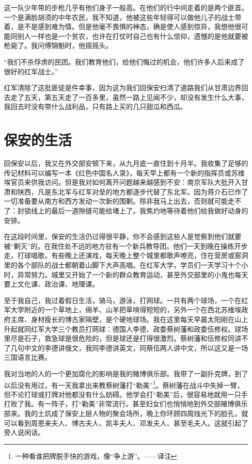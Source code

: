 \documentclass[10pt]{book}
\begin{document}
这一队少年带的步枪几乎有他们身子一般高。在他们的行中间走着的是两个匪首。一个是满脸胡须的中年农民，我不知道，他被这些年轻得可以做他儿子的战士带着，是不是感到难为情。但是他毫不畏惧的神态，确是使人感到惊异，我想他很可能同别人一样也是一个贫农，也许在打仗时自己也有什么信仰，遗憾的是他就要被枪毙了。我问傅锦魁时，他摇摇头。

“我们不杀俘虏的民团。我们教育他们，给他们悔过的机会，他们许多人后来成了很好的红军战士。”

红军清除了这批匪徒是件幸事，因为这为我们回保安扫清了道路我们从甘肃边界回去走了五天，第五天走了一百多里，虽然一路上见闻不少，却没有发生什么大事，我回去时没有带什么战利品，只有路上买的几只甜瓜和西瓜。



\section{保安的生活}

回保安以后，我又在外交部安顿下来，从九月底一直住到十月半。我收集了足够的传记材料可以编写一本《红色中国名人录》，每天早上都有一个新的指挥员或苏维埃官员来供我访问。但是我对如何离开问题越来越感到不安：南京军队大批开入甘肃和陕西，凡是东北军与红军对垒的地方都逐步代替了东北军。因为蒋介石已作了一切准备要从南方和西方发动一次新的围剿。除非我马上出去，否则就可能走不了：封锁线上的最后一道隙缝可能给堵上了。我焦灼地等待着他们给我做好动身的安排。

在这段时间里，保安的生活仍过得很平静，你不会感到这些人是觉察到他们就要被“剿灭”的。在我住处不远的地方驻有一个新兵教导团。他们一天到晚在操练开步走，打球唱歌。有些晚上还演戏，每天晚上整个城里都歌声嘹亮，住在营房或窑洞里的各个部队的战士都朝着山脚下大声高唱。在红军大学，学员们一天学习十个小时，异常努力。城里又开始了一个新的群众教育运动，甚至外交部里的小鬼也每天要上文化课、政治课、地理课。

至于我自己，我过着假日生活，骑马，游泳，打网球。一共有两个球场，一个在红军大学附近的一个草地上，绵羊、山羊把草啃得短短的，另外一个在西北苏维埃政府主席、身材瘦长的博古家隔壁，是个硬地球场。我在这里每天早晨太阳刚在山上升起就同红军大学三个教员打网球：德国人李德、政委蔡树藩和政委伍修权。球场里尽是石子，救急球是很危险的，但是球还是打得很激烈。蔡树藩和伍修权同讲不了几句中文的李德讲俄文，我同李德讲英文，同蔡伍两人讲中文，所以这又是一场三国语言比赛。

我对当地的人的一个更加腐化的影响是我的赌博俱乐部。我带了一副扑克牌，到了以后没有用过，有一天我拿出来教蔡树藩打“勒美”\footnote{一种看谁把牌脱手快的游戏，像“争上游”。——译注}。蔡树藩在战斗中失掉一臂，但不论打球或打牌对他都没有什么妨碍。他学会打“勒美”后，很容易地就用一只手打败了我。有一阵子，打“勒美”非常流行。甚至妇女们也悄悄地到外交部赌博俱乐部来。我的土炕成了保安上层人物的聚会场所，晚上你环顾四周烛光下的脸孔，就可以看到周恩来夫人、博古夫人、凯丰夫人、邓发夫人、甚至毛夫人。这就引起了旁人说闲话。
\end{document}

